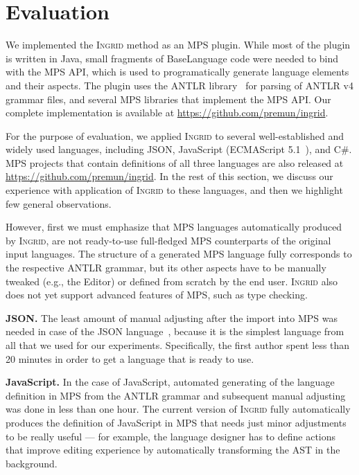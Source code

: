 \section{Evaluation}
\label{sect:EVAL}

We implemented the \textsc{Ingrid} method as an MPS plugin.
While most of the plugin is written in Java, small fragments of BaseLanguage code were needed to bind with the MPS API, which is used to programatically generate language elements and their aspects.
The plugin uses the ANTLR library~\cite{ref:ANTLR} for parsing of ANTLR v4 grammar files, and several MPS libraries that implement the MPS API.
Our complete implementation is available at \url{https://github.com/premun/ingrid}.

For the purpose of evaluation, we applied \textsc{Ingrid} to several well-established and widely used languages, including JSON, JavaScript (ECMAScript 5.1~\cite{ref:ECMASCRIPT51}), and C\#.
MPS projects that contain definitions of all three languages are also released at \url{https://github.com/premun/ingrid}.
In the rest of this section, we discuss our experience with application of \textsc{Ingrid} to these languages, and then we highlight few general observations.

However, first we must emphasize that MPS languages automatically produced by \textsc{Ingrid}, are not ready-to-use full-fledged MPS counterparts of the original input languages.
The structure of a generated MPS language fully corresponds to the respective ANTLR grammar, but its other aspects have to be manually tweaked (e.g., the Editor) or defined from scratch by the end user.
\textsc{Ingrid} also does not yet support advanced features of MPS, such as type checking.

\noindent\textbf{JSON.}
The least amount of manual adjusting after the import into MPS was needed in case of the JSON language~\cite{ref:JSON}, because it is the simplest language from all that we used for our experiments.
Specifically, the first author spent less than 20 minutes in order to get a language that is ready to use.

\noindent\textbf{JavaScript.}
In the case of JavaScript, automated generating of the language definition in MPS from the ANTLR grammar and subsequent manual adjusting was done in less than one hour.
The current version of \textsc{Ingrid} fully automatically produces the definition of JavaScript in MPS that needs just minor adjustments to be really useful --- for example, the language designer has to define actions that improve editing experience by automatically transforming the AST in the background.

